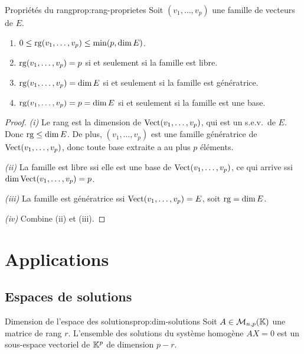 \begin{proposition}{Propriétés du rang}{prop:rang-proprietes}
  Soit $(v_1,\ldots,v_p)$ une famille de vecteurs de $E$.
  \begin{enumerate}[label=(\roman*)]
    \item $0\leq\operatorname{rg}(v_1,\ldots,v_p)\leq\min(p,\dim E)$.
    \item $\operatorname{rg}(v_1,\ldots,v_p)=p$ si et seulement si la famille est libre.
    \item $\operatorname{rg}(v_1,\ldots,v_p)=\dim E$ si et seulement si la famille est
      génératrice.
    \item $\operatorname{rg}(v_1,\ldots,v_p)=p=\dim E$ si et seulement si la famille
      est une base.
  \end{enumerate}
\end{proposition}

\begin{proof}
  \emph{(i)} Le rang est la dimension de $\operatorname{Vect}(v_1,\ldots,v_p)$, qui
  est un s.e.v.\ de $E$. Donc $\operatorname{rg}\leq\dim E$. De plus,
  $(v_1,\ldots,v_p)$ est une famille génératrice de
  $\operatorname{Vect}(v_1,\ldots,v_p)$, donc toute base extraite a au plus $p$
  éléments.

  \emph{(ii)} La famille est libre ssi elle est une base de
  $\operatorname{Vect}(v_1,\ldots,v_p)$, ce qui arrive ssi
  $\dim\operatorname{Vect}(v_1,\ldots,v_p)=p$.

  \emph{(iii)} La famille est génératrice ssi
  $\operatorname{Vect}(v_1,\ldots,v_p)=E$, soit $\operatorname{rg}=\dim E$.

  \emph{(iv)} Combine (ii) et (iii).
\end{proof}

\section{Applications}\label{sec:ev-applications}

\subsection{Espaces de solutions}\label{subsec:espaces-solutions}

\begin{proposition}{Dimension de l'espace des solutions}{prop:dim-solutions}
  Soit $A\in\mathcal{M}_{n,p}({\mathbb{K}})$ une matrice de rang $r$. L'ensemble des
  solutions du système homogène $AX=0$ est un sous-espace vectoriel de
  ${\mathbb{K}}^p$ de dimension $p-r$.
\end{proposition}

